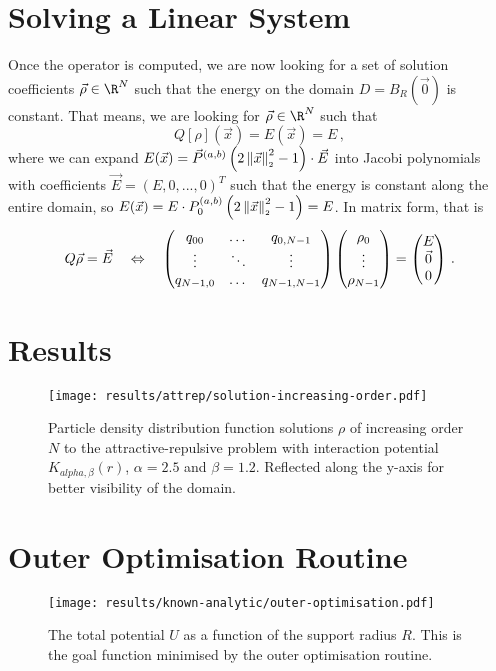 \section{Solving a Linear System}
Once the operator is computed, we are now looking for a set of solution coefficients $\vec{\rho} \in \R^N$ such that the energy on the domain $D = B_R(\vec{0})$ is constant.
That means, we are looking for $\vec{\rho} \in \R^N$ such that
\begin{equation}
  Q[\rho](\vec{x}) = E(\vec{x}) = E\,,
\end{equation}
where we can expand $E(\vec{x}) = \vec{P}^{(a, b)}\left(2 \left\lVert\vec{x}\right\rVert_{\scriptscriptstyle 2}^2 - 1\right) \cdot \vec{E}$ into Jacobi polynomials with coefficients $\vec{E} = (E, 0, ..., 0)^T$ such that the energy is constant along the entire domain, so $E(\vec{x}) = E \cdot P_0^{(a, b)}\left(2 \left\lVert\vec{x}\right\rVert_{\scriptscriptstyle 2}^2 - 1\right) = E$.
In matrix form, that is
$$Q \vec{\rho} = \vec{E} \quad\Leftrightarrow\quad \begin{pmatrix}
    q_{00}    & \dots  & q_{0,N-1}   \\
    \vdots    & \ddots & \vdots      \\
    q_{N-1,0} & \dots  & q_{N-1,N-1} \\
  \end{pmatrix} \begin{pmatrix}
    \rho_0 \\
    \vdots \\
    \rho_{N-1}
  \end{pmatrix} = \begin{pmatrix}
    E       \\
    \vec{0} \\
    0
  \end{pmatrix}\,.$$

\section{Results}
\begin{figure}[H]
  \centering
  \label{fig:solution-increasing-order}
  \texttt{[image: results/attrep/solution-increasing-order.pdf]}
  \caption[Solutions of increasing orders]{Particle density distribution function solutions $\rho$ of increasing order $N$ to the attractive-repulsive problem with interaction potential $K_{alpha, \beta}(r)$, $\alpha = 2.5$ and $\beta = 1.2$. Reflected along the y-axis for better visibility of the domain.}
\end{figure}

\section{Outer Optimisation Routine}
\begin{figure}[H]
  \centering
  \label{fig:outer-optimisation}
  \texttt{[image: results/known-analytic/outer-optimisation.pdf]}
  \caption[Outer Optimisation Routine]{The total potential $U$ as a function of the support radius $R$. This is the goal function minimised by the outer optimisation routine.}
\end{figure}


